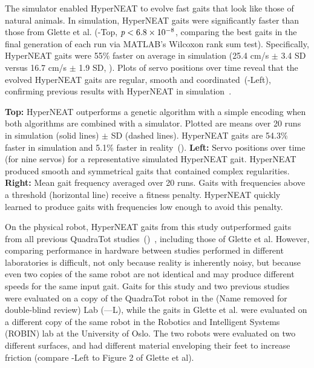 

The simulator enabled HyperNEAT to evolve
fast gaits that look like those of natural animals. In simulation, HyperNEAT gaits were significantly faster than those from Glette et al. (-Top, $\emph{p} < 6.8\times10^{-8}$, comparing the best gaits in the final generation of each run via MATLAB's Wilcoxon rank sum test).  
Specifically, HyperNEAT gaits were 55\% faster on average in simulation (25.4
cm/s $\pm$ 3.4 SD versus 16.7 cm/s $\pm$ 1.9 SD, ).
Plots of servo positions over time reveal that the evolved HyperNEAT gaits are regular, smooth and coordinated~(-Left), confirming previous results with HyperNEAT in simulation~\cite{clune2011performance,clune2009evolving}.

{
\textbf{Top: }
HyperNEAT outperforms a genetic algorithm with a simple encoding when both algorithms are combined with a simulator. Plotted are means over 20 runs in simulation (solid lines) $\pm$ SD (dashed lines). HyperNEAT gaits are 54.3\% faster in
simulation and 5.1\% faster in reality~().
\textbf{Left: }
Servo positions over time (for nine servos) for a representative simulated HyperNEAT gait. HyperNEAT produced smooth and symmetrical gaits that contained complex regularities. 
\textbf{Right: }Mean gait frequency averaged over 20 runs. 
Gaits with frequencies above a threshold (horizontal line) receive a fitness penalty. HyperNEAT quickly learned to produce gaits with frequencies low enough to avoid this penalty.
}


On the physical robot, HyperNEAT gaits from this study outperformed gaits from all previous QuadraTot studies~()~\cite{yos:clune,haocheng,glette}, including those of Glette et al. 
 However, comparing performance in hardware between studies performed in
different laboratories is difficult, not only because reality is
inherently noisy, but because even two copies of the same robot are
not identical and may produce different speeds for the same input
gait. Gaits for this study and two previous studies~\cite{yos:clune,haocheng} were evaluated on a copy of the QuadraTot robot in the (Name removed for double-blind review) Lab (---L), while the gaits in Glette et al. were evaluated on a different copy of the same robot in the Robotics and
Intelligent Systems (ROBIN) lab at the University of Oslo. The two robots were evaluated on two different surfaces, and had different material enveloping their feet to increase friction (compare -Left to Figure 2 of Glette et al). 

